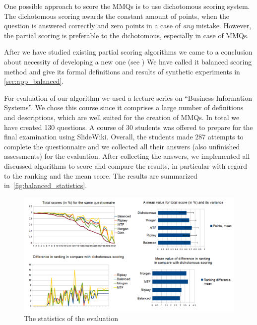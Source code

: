 \documentclass[ngerman,UKenglish,table]{scrbook}
\begin{document}
One possible approach to score the MMQs is to use dichotomous scoring system. 
The dichotomous scoring awards the constant amount of points, when the question is answered correctly and zero points in a case of \textit{any} mistake.
However, the partial scoring is preferable to the dichotomous, especially in case of MMQs.~\cite{Ripkey1996,Jiao2012,Bauer2011,Ben-Simon1997} 

After we have studied existing partial scoring algorithms we came to a conclusion about necessity of developing a new one (see \cite{tarasowa2013balanced})
We have called it balanced scoring method and give its formal definitions and results of synthetic experiments in \autoref{sec:app_balanced}.

For evaluation of our algorithm we used a lecture series on ``Business Information Systems''. 
We chose this course since it comprises a large number of definitions and descriptions, which are well suited for the creation of MMQs. 
In total we have created 130 questions.
A course of 30 students was offered to prepare for the final examination using SlideWiki.
Overall, the students made 287 attempts to complete the questionnaire and we collected all their answers (also unfinished assessments) for the evaluation.
After collecting the answers, we implemented all discussed algorithms to score  and compare the results, in particular with regard to the ranking and the mean score.
The results are summarized in~\autoref{fig:balanced_statistics}.

\begin{figure}[t!]
	\centering
		\includegraphics[width=\textwidth]{images/statistics.png}
	\caption{The statistics of the evaluation}
	\label{fig:balanced_statistics}
\end{figure}
\end{document}
